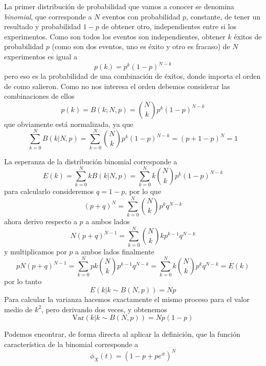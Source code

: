 \documentclass{article}
\numberwithin{equation}{section} %
\begin{document}
La primer distribución de probabilidad que vamos a conocer se denomina \emph{binomial}, que corresponde a $N$ eventos con probabilidad $p$, constante, de tener un resultado y probabilidad $1 - p$ de obtener otro, independientes entre si los experimentos. Como son todos los eventos son independientes, obtener $k$ éxitos de probabilidad $p$ (como son dos eventos, uno es éxito y otro es fracaso) de $N$ experimentos es igual a
\[ p(k) = p^{k} (1-p)^{N-k}\]
pero eso es la probabilidad de una combinación de éxitos, donde importa el orden de como salieron. Como no nos interesa el orden debemos considerar las combinaciones de ellos
\begin{equation}
p(k) = B(k ; N, p) = \binom{N}{k} p^{k} (1 - p)^{N - k}
\end{equation}
que obviamente está normalizada, ya que
\begin{equation}
\sum_{k = 0}^{N} B(k | N, p) = \sum_{k = 0}^{N} \binom{N}{k} p^k (1 - p)^{N - k} = (p + 1 - p)^{N} = 1
\end{equation}

La esperanza de la distribución binomial corresponde a 
\[ E(k) = \sum_{k = 0}^{N} k B(k | N, p) = \sum_{k = 0}^{N} k \binom{N}{k} p^k (1 - p)^{N - k} \]
para calcularlo consideremos $q = 1- p$, por lo que
\[(p + q)^{N} = \sum_{k = 0}^{N} \binom{N}{k} p^k q^{N - k}\]
ahora derivo respecto a $p$ a ambos lados
\[ N  (p + q)^{N-1} = \sum_{k = 0}^{N} \binom{N}{k} k p^{k - 1} q^{N - k} \]
y multiplicamos por $p$ a ambos lados finalmente
\[ p N (p + q)^{N - 1} = \sum_{k = 0}^{N} p k \binom{N}{k} p^{k - 1} q^{N - k} = \sum_{k = 0}^{N} k \binom{N}{k} p^{k} q^{N - k} = E(k)\]
por lo tanto
\begin{equation}
E(k| k \sim B(N, p)) = N p
\end{equation}
Para calcular la varianza hacemos exactamente el mismo proceso para el valor medio de $k^2$, pero derivando dos veces, y obtenemos
\begin{equation}
\text{Var}(k|k\sim B(N,p)) = N p ( 1 - p)
\end{equation}

Podemos encontrar, de forma directa al aplicar la definición, que la función característica de la binomial corresponde a
\begin{equation}
\phi_{X}(t) = (1 - p + p e^{it})^{N}
\end{equation}
\end{document}
